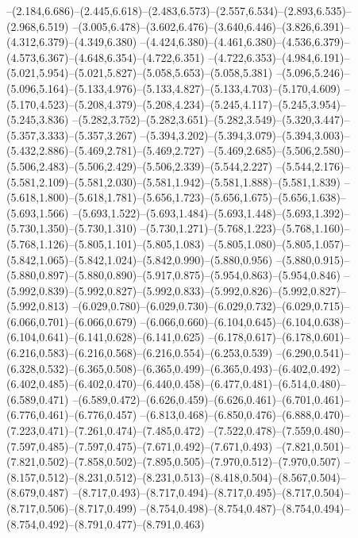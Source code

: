   --(2.184,6.686)--(2.445,6.618)--(2.483,6.573)--(2.557,6.534)--(2.893,6.535)--(2.968,6.519)%
  --(3.005,6.478)--(3.602,6.476)--(3.640,6.446)--(3.826,6.391)--(4.312,6.379)--(4.349,6.380)%
  --(4.424,6.380)--(4.461,6.380)--(4.536,6.379)--(4.573,6.367)--(4.648,6.354)--(4.722,6.351)%
  --(4.722,6.353)--(4.984,6.191)--(5.021,5.954)--(5.021,5.827)--(5.058,5.653)--(5.058,5.381)%
  --(5.096,5.246)--(5.096,5.164)--(5.133,4.976)--(5.133,4.827)--(5.133,4.703)--(5.170,4.609)%
  --(5.170,4.523)--(5.208,4.379)--(5.208,4.234)--(5.245,4.117)--(5.245,3.954)--(5.245,3.836)%
  --(5.282,3.752)--(5.282,3.651)--(5.282,3.549)--(5.320,3.447)--(5.357,3.333)--(5.357,3.267)%
  --(5.394,3.202)--(5.394,3.079)--(5.394,3.003)--(5.432,2.886)--(5.469,2.781)--(5.469,2.727)%
  --(5.469,2.685)--(5.506,2.580)--(5.506,2.483)--(5.506,2.429)--(5.506,2.339)--(5.544,2.227)%
  --(5.544,2.176)--(5.581,2.109)--(5.581,2.030)--(5.581,1.942)--(5.581,1.888)--(5.581,1.839)%
  --(5.618,1.800)--(5.618,1.781)--(5.656,1.723)--(5.656,1.675)--(5.656,1.638)--(5.693,1.566)%
  --(5.693,1.522)--(5.693,1.484)--(5.693,1.448)--(5.693,1.392)--(5.730,1.350)--(5.730,1.310)%
  --(5.730,1.271)--(5.768,1.223)--(5.768,1.160)--(5.768,1.126)--(5.805,1.101)--(5.805,1.083)%
  --(5.805,1.080)--(5.805,1.057)--(5.842,1.065)--(5.842,1.024)--(5.842,0.990)--(5.880,0.956)%
  --(5.880,0.915)--(5.880,0.897)--(5.880,0.890)--(5.917,0.875)--(5.954,0.863)--(5.954,0.846)%
  --(5.992,0.839)--(5.992,0.827)--(5.992,0.833)--(5.992,0.826)--(5.992,0.827)--(5.992,0.813)%
  --(6.029,0.780)--(6.029,0.730)--(6.029,0.732)--(6.029,0.715)--(6.066,0.701)--(6.066,0.679)%
  --(6.066,0.660)--(6.104,0.645)--(6.104,0.638)--(6.104,0.641)--(6.141,0.628)--(6.141,0.625)%
  --(6.178,0.617)--(6.178,0.601)--(6.216,0.583)--(6.216,0.568)--(6.216,0.554)--(6.253,0.539)%
  --(6.290,0.541)--(6.328,0.532)--(6.365,0.508)--(6.365,0.499)--(6.365,0.493)--(6.402,0.492)%
  --(6.402,0.485)--(6.402,0.470)--(6.440,0.458)--(6.477,0.481)--(6.514,0.480)--(6.589,0.471)%
  --(6.589,0.472)--(6.626,0.459)--(6.626,0.461)--(6.701,0.461)--(6.776,0.461)--(6.776,0.457)%
  --(6.813,0.468)--(6.850,0.476)--(6.888,0.470)--(7.223,0.471)--(7.261,0.474)--(7.485,0.472)%
  --(7.522,0.478)--(7.559,0.480)--(7.597,0.485)--(7.597,0.475)--(7.671,0.492)--(7.671,0.493)%
  --(7.821,0.501)--(7.821,0.502)--(7.858,0.502)--(7.895,0.505)--(7.970,0.512)--(7.970,0.507)%
  --(8.157,0.512)--(8.231,0.512)--(8.231,0.513)--(8.418,0.504)--(8.567,0.504)--(8.679,0.487)%
  --(8.717,0.493)--(8.717,0.494)--(8.717,0.495)--(8.717,0.504)--(8.717,0.506)--(8.717,0.499)%
  --(8.754,0.498)--(8.754,0.487)--(8.754,0.494)--(8.754,0.492)--(8.791,0.477)--(8.791,0.463)%
